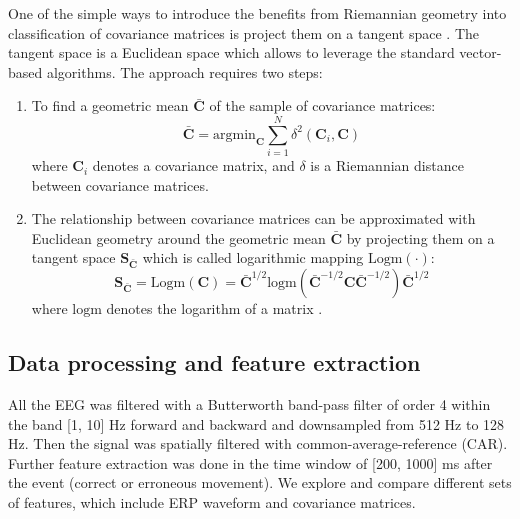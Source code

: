 \documentclass[12pt]{iopart}
\begin{document}
One of the simple ways to introduce the benefits from Riemannian geometry
into classification of covariance matrices is project them
on a tangent space \cite{barachant_multiclass_2012}. 
The tangent space is a Euclidean space which allows
to leverage the standard vector-based algorithms.
The approach requires two steps:
\begin{enumerate}
    \item To find a geometric mean $\bar{\mathbf{C}}$ of the sample of covariance matrices:
        \begin{equation}
            \bar{\mathbf{C}} = \textrm{argmin}_\mathbf{C} \sum_{i=1}^N \delta^2 (\mathbf{C}_i, \mathbf{C})
            \label{eq:geommean}
        \end{equation}
        where $\mathbf{C}_i$ denotes a covariance matrix, and $\delta$ is a 
        Riemannian distance between covariance matrices.
    \item The relationship between covariance matrices can be approximated with
        Euclidean geometry around the geometric mean $\bar{\mathbf{C}}$ by projecting them on a tangent
        space $\mathbf{S}_{\bar{\mathbf{C}}}$ which is called logarithmic mapping $\mathrm{Logm}(\cdot)$:
        \begin{equation}
            \mathbf{S}_{\bar{\mathbf{C}}} = \mathrm{Logm}( \mathbf{C}) = \bar{\mathbf{C}}^{1/2}
            \textrm{logm}(\bar{\mathbf{C}}^{-1/2}\mathbf{C}\bar{\mathbf{C}}^{-1/2})\bar{\mathbf{C}}^{1/2}
            \label{eq:logm}
        \end{equation}
        where $\textrm{logm}$ denotes the logarithm of a matrix \cite{berger_panoramic_2003}.
\end{enumerate}

\subsection{Data processing and feature extraction}
All the EEG was filtered with a Butterworth band-pass filter of order 4 within the band [1, 10] Hz
forward and backward and downsampled from 512 Hz to 128 Hz. Then the signal was spatially
filtered with common-average-reference (CAR). Further feature extraction was done
in the time window of [200, 1000] ms after the event (correct or erroneous movement).
We explore and compare different sets
of features, which include ERP waveform and covariance matrices.
\end{document}
